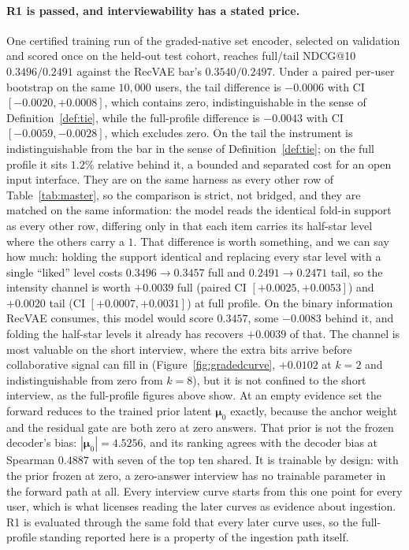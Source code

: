 \documentclass[manuscript,screen,review]{acmart}
\newcommand{\bmu}{\boldsymbol{\mu}}
\begin{document}
\paragraph{R1 is passed, and interviewability has a stated price.} One certified training run of the graded-native set encoder, selected on validation and scored once on the held-out test cohort, reaches full/tail NDCG@10 $\mathbf{0.3496/0.2491}$ against the RecVAE bar's $0.3540/0.2497$. Under a paired per-user bootstrap on the same $10{,}000$ users, the tail difference is $-0.0006$ with CI $[-0.0020,+0.0008]$, which contains zero, indistinguishable in the sense of Definition~\ref{def:tie}, while the full-profile difference is $-0.0043$ with CI $[-0.0059,-0.0028]$, which excludes zero. On the tail the instrument is indistinguishable from the bar in the sense of Definition~\ref{def:tie}; on the full profile it sits $1.2\%$ relative behind it, a bounded and separated cost for an open input interface.  They are on the same harness as every other row of Table~\ref{tab:master}, so the comparison is strict, not bridged, and they are matched on the same information: the model reads the identical fold-in support as every other row, differing only in that each item carries its half-star level where the others carry a $1$. That difference is worth something, and we can say how much: holding the support identical and replacing every star level with a single ``liked'' level costs $0.3496\rightarrow0.3457$ full and $0.2491\rightarrow0.2471$ tail, so the intensity channel is worth $+0.0039$ full (paired CI $[+0.0025,+0.0053]$) and $+0.0020$ tail (CI $[+0.0007,+0.0031]$) at full profile. On the binary information RecVAE consumes, this model would score $0.3457$, some $-0.0083$ behind it, and folding the half-star levels it already has recovers $+0.0039$ of that. The channel is most valuable on the short interview, where the extra bits arrive before collaborative signal can fill in (Figure~\ref{fig:gradedcurve}, $+0.0102$ at $k{=}2$ and indistinguishable from zero from $k{=}8$), but it is not confined to the short interview, as the full-profile figures above show. At an empty evidence set the forward reduces to the trained prior latent $\bmu_0$ exactly, because the anchor weight and the residual gate are both zero at zero answers. That prior is not the frozen decoder's bias: $|\bmu_0|=4.5256$, and its ranking agrees with the decoder bias at Spearman $0.4887$ with seven of the top ten shared. It is trainable by design: with the prior frozen at zero, a zero-answer interview has no trainable parameter in the forward path at all. Every interview curve starts from this one point for every user, which is what licenses reading the later curves as evidence about ingestion. R1 is evaluated through the same fold that every later curve uses, so the full-profile standing reported here is a property of the ingestion path itself.
\end{document}
